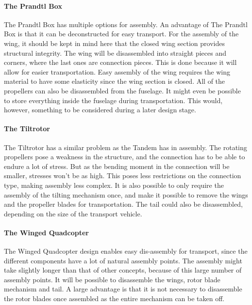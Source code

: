 \paragraph{The Prandtl Box} 
The Prandtl Box has multiple options for assembly. An advantage of The Prandtl Box is that it can be deconstructed for easy transport. For the assembly of the wing, it should be kept in mind here that the closed wing section provides structural integrity. The wing will be disassembled into  straight pieces and corners, where the last ones are connection pieces. This is done because it will allow for easier transportation. Easy assembly of the wing requires the wing material to have some elasticity since the wing section is closed.
All of the propellers can also be disassembled from the fuselage. It might even be possible to store everything inside the fuselage during transportation. This would, however, something to be considered during a later design stage.


\paragraph{The Tiltrotor}
The Tiltrotor has a similar problem as the Tandem has in assembly. The rotating propellers pose a weakness in the structure, and the connection has to be able to endure a lot of stress. But as the bending moment in the connection will be smaller, stresses won't be as high. This poses less restrictions on the connection type, making assembly less complex. It is also possible to only require the assembly of the tilting mechanism once, and make it possible to remove the wings and the propeller blades for transportation. The tail could also be disassembled, depending on the size of the transport vehicle.


\paragraph{The Winged Quadcopter}
The Winged Quadcopter design enables easy dis-assembly for transport, since the different components have a lot of natural assembly points. The assembly might take slightly longer than that of other concepts, because of this large number of assembly points. It will be possible to disassemble the wings, rotor blade mechanism and tail. A large advantage is that it is not necessary to disassemble the rotor blades once assembled as the entire mechanism can be taken off.



